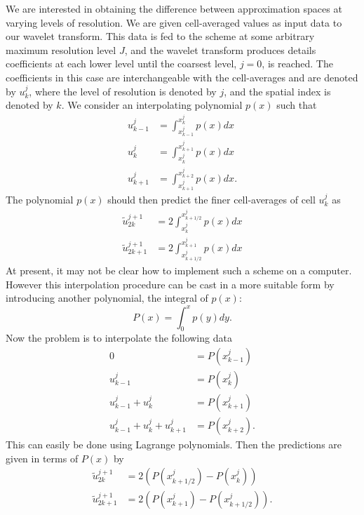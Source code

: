 \documentclass[]{article}
\begin{document}
    We are interested in obtaining the difference between approximation spaces at varying levels of resolution. We 
    are given cell-averaged values as input data to our wavelet transform. This data is fed to the scheme at some arbitrary maximum
    resolution level $J$, and the wavelet transform produces details coefficients at each lower level until the coarsest level,
    $j=0$, is reached. The coefficients in this case are interchangeable with the cell-averages and are denoted by $u^{j}_{k}$,
    where the level of resolution is denoted by $j$, and the spatial index is denoted by $k$. We consider an interpolating
    polynomial $p(x)$ such that 
    \begin{align}
        u^{j}_{k-1} &= \int_{x^{j}_{k-1}}^{x^{j}_{k}} p(x) dx \\
        u^{j}_{k} &= \int_{x^{j}_{k}}^{x^{j}_{k+1}} p(x) dx \\
        u^{j}_{k+1} &= \int_{x^{j}_{k+1}}^{x^{j}_{k+2}} p(x) dx.
    \end{align}
    The polynomial $p(x)$ should then predict the finer cell-averages of cell $u^{j}_{k}$ as
    \begin{align}
        \tilde{u}^{j+1}_{2k} &= 2 \int_{x^{j}_{k}}^{x^{j}_{k+1/2}} p(x) dx \\
        \tilde{u}^{j+1}_{2k+1} &= 2 \int_{x^{j}_{k+1/2}}^{x^{j}_{k+1}} p(x) dx
    \end{align}
    At present, it may not be clear how to implement such a scheme on a computer. However this interpolation procedure
    can be cast in a more suitable form by introducing another polynomial, the integral of $p(x)$:
    \begin{equation}
        P(x) = \int_{0}^{x} p(y) dy.
    \end{equation}
    Now the problem is to interpolate the following data
    \begin{align}
        0 &= P(x^{j}_{k-1}) \\
        u^{j}_{k-1} &= P(x^{j}_{k}) \\
        u^{j}_{k-1} + u^{j}_{k} &= P(x^{j}_{k+1}) \\
        u^{j}_{k-1} + u^{j}_{k} + u^{j}_{k+1} &= P(x^{j}_{k+2}).
    \end{align}
    This can easily be done using Lagrange polynomials. Then the predictions are given in terms of $P(x)$ by
    \begin{align}
        \tilde{u}^{j+1}_{2k} &= 2 \left( P(x^{j}_{k+1/2}) - P(x^{j}_{k}) \right) \\
        \tilde{u}^{j+1}_{2k+1} &= 2 \left( P(x^{j}_{k+1}) - P(x^{j}_{k+1/2}) \right).
    \end{align}
\end{document}
